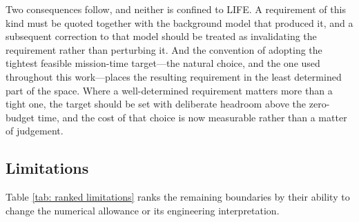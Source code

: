 \documentclass[12pt,a4paper]{article}
\numberwithin{equation}{section}
\numberwithin{figure}{section}
\numberwithin{table}{section}
\begin{document}
Two consequences follow, and neither is confined to LIFE. A requirement of this kind must be quoted together with the background model that produced it, and a subsequent correction to that model should be treated as invalidating the requirement rather than perturbing it. And the convention of adopting the tightest feasible mission-time target---the natural choice, and the one used throughout this work---places the resulting requirement in the least determined part of the space. Where a well-determined requirement matters more than a tight one, the target should be set with deliberate headroom above the zero-budget time, and the cost of that choice is now measurable rather than a matter of judgement.

\subsection{Limitations}
Table \ref{tab: ranked limitations} ranks the remaining boundaries by their ability to change the numerical allowance or its engineering interpretation.
\end{document}
